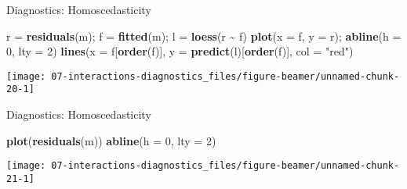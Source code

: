\documentclass[
  ignorenonframetext,
]{beamer}
\newenvironment{Shaded}{\begin{snugshade}}{\end{snugshade}}
\newcommand{\AttributeTok}[1]{\textcolor[rgb]{0.13,0.29,0.53}{#1}}
\newcommand{\DecValTok}[1]{\textcolor[rgb]{0.00,0.00,0.81}{#1}}
\newcommand{\FunctionTok}[1]{\textcolor[rgb]{0.13,0.29,0.53}{\textbf{#1}}}
\newcommand{\NormalTok}[1]{#1}
\newcommand{\OtherTok}[1]{\textcolor[rgb]{0.56,0.35,0.01}{#1}}
\newcommand{\SpecialCharTok}[1]{\textcolor[rgb]{0.81,0.36,0.00}{\textbf{#1}}}
\newcommand{\StringTok}[1]{\textcolor[rgb]{0.31,0.60,0.02}{#1}}
\begin{document}
\begin{frame}[fragile]{Diagnostics: Homoscedasticity}
\label{diagnostics-homoscedasticity}
\begin{Shaded}
\begin{Highlighting}[]
\NormalTok{r }\OtherTok{=} \FunctionTok{residuals}\NormalTok{(m); f }\OtherTok{=} \FunctionTok{fitted}\NormalTok{(m); l }\OtherTok{=} \FunctionTok{loess}\NormalTok{(r }\SpecialCharTok{\textasciitilde{}}\NormalTok{ f)}
\FunctionTok{plot}\NormalTok{(}\AttributeTok{x =}\NormalTok{ f, }\AttributeTok{y =}\NormalTok{ r); }\FunctionTok{abline}\NormalTok{(}\AttributeTok{h =} \DecValTok{0}\NormalTok{, }\AttributeTok{lty =} \DecValTok{2}\NormalTok{)}
\FunctionTok{lines}\NormalTok{(}\AttributeTok{x =}\NormalTok{ f[}\FunctionTok{order}\NormalTok{(f)], }\AttributeTok{y =} \FunctionTok{predict}\NormalTok{(l)[}\FunctionTok{order}\NormalTok{(f)], }\AttributeTok{col =} \StringTok{"red"}\NormalTok{)}
\end{Highlighting}
\end{Shaded}

\texttt{[image: 07-interactions-diagnostics\_files/figure-beamer/unnamed-chunk-20-1]}
\end{frame}

\begin{frame}[fragile]{Diagnostics: Homoscedasticity}
\label{diagnostics-homoscedasticity-1}
\begin{Shaded}
\begin{Highlighting}[]
\FunctionTok{plot}\NormalTok{(}\FunctionTok{residuals}\NormalTok{(m))}
\FunctionTok{abline}\NormalTok{(}\AttributeTok{h =} \DecValTok{0}\NormalTok{, }\AttributeTok{lty =} \DecValTok{2}\NormalTok{)}
\end{Highlighting}
\end{Shaded}

\texttt{[image: 07-interactions-diagnostics\_files/figure-beamer/unnamed-chunk-21-1]}
\end{frame}
\end{document}
